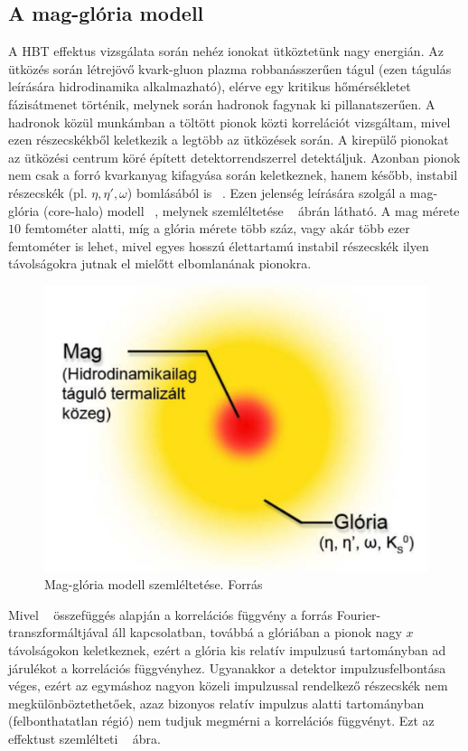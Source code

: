 \documentclass[11pt,a4paper]{article}
\numberwithin{equation}{subsection}
\numberwithin{figure}{section}
\begin{document}
\subsection{A mag-glória modell}
A HBT effektus vizsgálata során nehéz ionokat ütköztetünk nagy energián. Az ütközés során létrejövő kvark-gluon plazma robbanásszerűen tágul (ezen tágulás leírására hidrodinamika alkalmazható), elérve egy kritikus hőmérsékletet fázisátmenet történik, melynek során hadronok fagynak ki pillanatszerűen. A hadronok közül munkámban a  töltött pionok közti korrelációt vizsgáltam, mivel ezen részecskékből keletkezik a legtöbb az ütközések során. A kirepülő pionokat az ütközési centrum köré épített detektorrendszerrel detektáljuk. Azonban pionok nem csak a forró kvarkanyag kifagyása során  keletkeznek, hanem később, instabil részecskék (pl. $\eta,\eta',\omega$) bomlásából is ~\cite{Bolz:1992hc}. Ezen jelenség leírására szolgál a mag-glória (core-halo) modell ~\cite{Csorgo:1994in,Csorgo:1999sj}, melynek szemléltetése ~ ábrán látható. A mag mérete $10$ femtométer alatti, míg a glória mérete több száz, vagy akár több ezer femtométer is lehet, mivel egyes hosszú élettartamú instabil részecskék ilyen távolságokra jutnak el mielőtt elbomlanának pionokra.
\begin{figure}[H]
\centering
\includegraphics[scale=0.39]{pic/BEintro/CH1}
\caption{Mag-glória modell szemléltetése. Forrás \cite{Kofarago}}
\label{fig:ch1}
\end{figure}

Mivel ~ összefüggés alapján a korrelációs függvény a forrás Fourier-transzformáltjával áll kapcsolatban, továbbá a glóriában a pionok nagy $x$ távolságokon keletkeznek, ezért a glória  kis relatív impulzusú tartományban ad járulékot a korrelációs függvényhez. Ugyanakkor a detektor impulzusfelbontása véges, ezért az egymáshoz nagyon közeli impulzussal rendelkező részecskék nem megkülönböztethetőek, azaz bizonyos relatív impulzus alatti tartományban (felbonthatatlan régió) nem tudjuk megmérni a korrelációs függvényt. Ezt az effektust szemlélteti ~ ábra.
\end{document}

